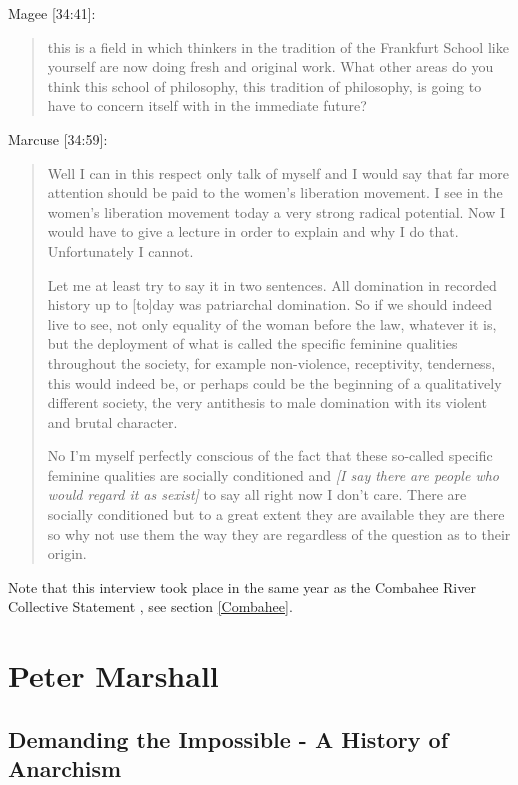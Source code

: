 \documentclass[10pt,titlepage]{book}
\begin{document}
Magee [34:41]:

\begin{quotation}

this is a field in which thinkers in the tradition of
the Frankfurt School like yourself are now doing fresh and original work.
What other areas do you think this school of philosophy,
this tradition of philosophy,
is going to have to concern itself with in the immediate future?
\end{quotation}

Marcuse [34:59]:

\begin{quotation}
Well I can in this respect only talk of myself and I would say that
far more attention should be paid to the women's liberation movement.
I see in the women's liberation movement today a very strong radical potential.
Now I would have to give a lecture in order to explain and why I do that.
Unfortunately I cannot.

Let me at least try to say it in two sentences.
All domination in recorded history up to [to]day was patriarchal domination.
So if we should indeed live to see, not only equality of the woman before the law,
whatever it is, but the deployment of what is called the specific feminine
qualities throughout the society, for example non-violence, receptivity,
tenderness, this would indeed be, or perhaps could be the beginning of a
qualitatively different society, the very antithesis to male domination with its
violent and brutal character.

No I'm myself perfectly conscious of the fact that these so-called specific
feminine qualities are socially conditioned and \emph{[I say there are people
who would regard it as sexist]} to say all right now I don't care.
There are socially conditioned but to a great extent they are available
they are there so why not use them the way they are regardless of the question
as to their origin.
\end{quotation}

Note that this interview took place in the same year as the Combahee River Collective Statement \cite{combahee-statement}, see section \ref{Combahee}.

\section{Peter Marshall}

\subsection{Demanding the Impossible - A History of Anarchism \cite{marshallHA}}
\end{document}

